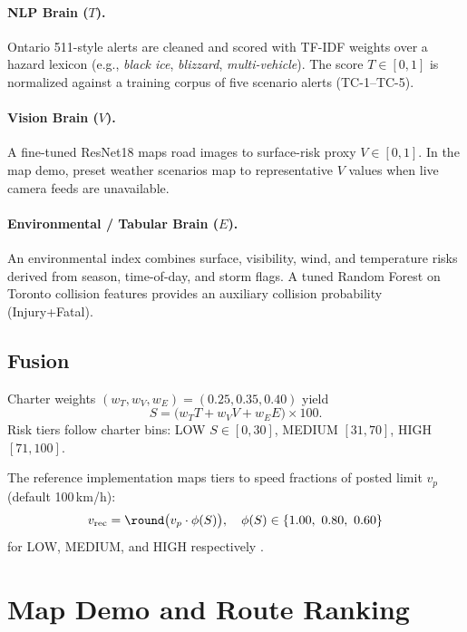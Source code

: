 \documentclass[11pt,a4paper]{article}
\begin{document}
\paragraph{NLP Brain ($T$).}
Ontario 511-style alerts are cleaned and scored with TF-IDF weights over a hazard lexicon (e.g., \emph{black ice}, \emph{blizzard}, \emph{multi-vehicle}). The score $T \in [0,1]$ is normalized against a training corpus of five scenario alerts (TC-1--TC-5).

\paragraph{Vision Brain ($V$).}
A fine-tuned ResNet18 maps road images to surface-risk proxy $V \in [0,1]$. In the map demo, preset weather scenarios map to representative $V$ values when live camera feeds are unavailable.

\paragraph{Environmental / Tabular Brain ($E$).}
An environmental index combines surface, visibility, wind, and temperature risks derived from season, time-of-day, and storm flags. A tuned Random Forest on Toronto collision features provides an auxiliary collision probability (Injury+Fatal).

\subsection{Fusion}
\label{sec:fusion}

Charter weights $(w_T, w_V, w_E) = (0.25, 0.35, 0.40)$ yield
\begin{equation}
  S = \bigl(w_T T + w_V V + w_E E\bigr) \times 100 .
  \label{eq:S}
\end{equation}
Risk tiers follow charter bins: LOW $S \in [0,30]$, MEDIUM $[31,70]$, HIGH $[71,100]$.

The reference implementation maps tiers to speed fractions of posted limit $v_p$ (default 100\,km/h):
\begin{equation}
  v_{\text{rec}} = \round\bigl(v_p \cdot \phi(S)\bigr), \quad
  \phi(S) \in \{1.00,\ 0.80,\ 0.60\}
  \label{eq:speed}
\end{equation}
for LOW, MEDIUM, and HIGH respectively \citep{sheridan_capstone2026}.

\section{Map Demo and Route Ranking}
\label{sec:demo}
\end{document}
